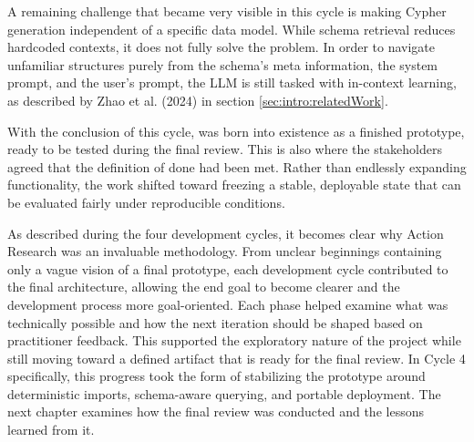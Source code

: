 A remaining challenge that became very visible in this cycle is making Cypher generation independent of a specific data model. While schema retrieval reduces hardcoded contexts, it does not fully solve the problem. In order to navigate unfamiliar structures purely from the schema's meta information, the system prompt, and the user's prompt, the LLM is still tasked with in-context learning, as described by Zhao et al. (2024) \cite{zhao2024retrieval} in section \ref{sec:intro:relatedWork}.

With the conclusion of this cycle, \prototype{} was born into existence as a finished prototype, ready to be tested during the final review. This is also where the stakeholders agreed that the definition of done had been met. Rather than endlessly expanding functionality, the work shifted toward freezing a stable, deployable state that can be evaluated fairly under reproducible conditions.

As described during the four development cycles, it becomes clear why Action Research was an invaluable methodology. From unclear beginnings containing only a vague vision of a final prototype, each development cycle contributed to the final architecture, allowing the end goal to become clearer and the development process more goal-oriented. Each phase helped examine what was technically possible and how the next iteration should be shaped based on practitioner feedback. This supported the exploratory nature of the project while still moving toward a defined artifact that is ready for the final review. In Cycle 4 specifically, this progress took the form of stabilizing the prototype around deterministic imports, schema-aware querying, and portable deployment. The next chapter examines how the final review was conducted and the lessons learned from it.


